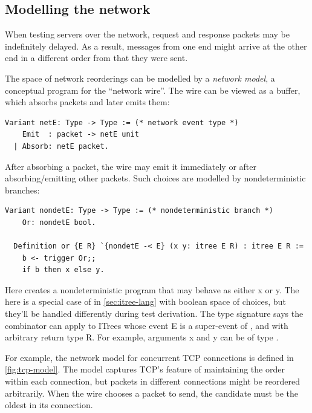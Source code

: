 \subsection{Modelling the network}
\label{sec:net-tcp}
When testing servers over the network, request and response packets may be
indefinitely delayed.  As a result, messages from one end might arrive at the
other end in a different order from that they were sent.

The space of network reorderings can be modelled by a {\em network model}, a
conceptual program for the ``network wire''.  The wire can be viewed as a
buffer, which absorbs packets and later emits them:
\begin{lstlisting}[style=customcoq]
  Variant netE: Type -> Type := (* network event type *)
    Emit  : packet -> netE unit
  | Absorb: netE packet.
\end{lstlisting}

After absorbing a packet, the wire may emit it immediately or after
absorbing/emitting other packets.  Such choices are modelled by nondeterministic
 branches:
\begin{lstlisting}[style=customcoq]
  Variant nondetE: Type -> Type := (* nondeterministic branch *)
    Or: nondetE bool.

  Definition or {E R} `{nondetE -< E} (x y: itree E R) : itree E R :=
    b <- trigger Or;;
    if b then x else y.
\end{lstlisting}

Here  creates a nondeterministic program that may behave as either
\ilc x or \ilc y.  The  here is a special case of  in
\autoref{sec:itree-lang} with boolean space of choices, but they'll be handled
differently during test derivation.  The type signature  says the  combinator can apply to ITrees whose event \ilc E
is a super-event of , and with arbitrary return type \ilc R.  For
example, arguments \ilc x and \ilc y can be of type .

For example, the network model for concurrent TCP connections is defined in
\autoref{fig:tcp-model}.  The model captures TCP's feature of maintaining the
order within each connection, but packets in different connections might be
reordered arbitrarily.  When the wire chooses a packet to send, the candidate
must be the oldest in its connection.

